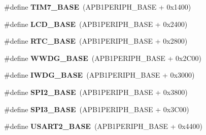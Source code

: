 \begin{DoxyCompactItemize}
\item 
\hypertarget{group___peripheral__memory__map_ga0ebf54364c6a2be6eb19ded6b18b6387}{\#define {\bfseries T\-I\-M7\-\_\-\-B\-A\-S\-E}~(A\-P\-B1\-P\-E\-R\-I\-P\-H\-\_\-\-B\-A\-S\-E + 0x1400)}\label{group___peripheral__memory__map_ga0ebf54364c6a2be6eb19ded6b18b6387}

\item 
\hypertarget{group___peripheral__memory__map_ga017749aad23300240ef5ac4c3d5ca750}{\#define {\bfseries L\-C\-D\-\_\-\-B\-A\-S\-E}~(A\-P\-B1\-P\-E\-R\-I\-P\-H\-\_\-\-B\-A\-S\-E + 0x2400)}\label{group___peripheral__memory__map_ga017749aad23300240ef5ac4c3d5ca750}

\item 
\hypertarget{group___peripheral__memory__map_ga4265e665d56225412e57a61d87417022}{\#define {\bfseries R\-T\-C\-\_\-\-B\-A\-S\-E}~(A\-P\-B1\-P\-E\-R\-I\-P\-H\-\_\-\-B\-A\-S\-E + 0x2800)}\label{group___peripheral__memory__map_ga4265e665d56225412e57a61d87417022}

\item 
\hypertarget{group___peripheral__memory__map_ga9a5bf4728ab93dea5b569f5b972cbe62}{\#define {\bfseries W\-W\-D\-G\-\_\-\-B\-A\-S\-E}~(A\-P\-B1\-P\-E\-R\-I\-P\-H\-\_\-\-B\-A\-S\-E + 0x2\-C00)}\label{group___peripheral__memory__map_ga9a5bf4728ab93dea5b569f5b972cbe62}

\item 
\hypertarget{group___peripheral__memory__map_ga8543ee4997296af5536b007cd4748f55}{\#define {\bfseries I\-W\-D\-G\-\_\-\-B\-A\-S\-E}~(A\-P\-B1\-P\-E\-R\-I\-P\-H\-\_\-\-B\-A\-S\-E + 0x3000)}\label{group___peripheral__memory__map_ga8543ee4997296af5536b007cd4748f55}

\item 
\hypertarget{group___peripheral__memory__map_gac3e357b4c25106ed375fb1affab6bb86}{\#define {\bfseries S\-P\-I2\-\_\-\-B\-A\-S\-E}~(A\-P\-B1\-P\-E\-R\-I\-P\-H\-\_\-\-B\-A\-S\-E + 0x3800)}\label{group___peripheral__memory__map_gac3e357b4c25106ed375fb1affab6bb86}

\item 
\hypertarget{group___peripheral__memory__map_gae634fe8faa6922690e90fbec2fc86162}{\#define {\bfseries S\-P\-I3\-\_\-\-B\-A\-S\-E}~(A\-P\-B1\-P\-E\-R\-I\-P\-H\-\_\-\-B\-A\-S\-E + 0x3\-C00)}\label{group___peripheral__memory__map_gae634fe8faa6922690e90fbec2fc86162}

\item 
\hypertarget{group___peripheral__memory__map_gade83162a04bca0b15b39018a8e8ec090}{\#define {\bfseries U\-S\-A\-R\-T2\-\_\-\-B\-A\-S\-E}~(A\-P\-B1\-P\-E\-R\-I\-P\-H\-\_\-\-B\-A\-S\-E + 0x4400)}\label{group___peripheral__memory__map_gade83162a04bca0b15b39018a8e8ec090}


\end{DoxyCompactItemize}
